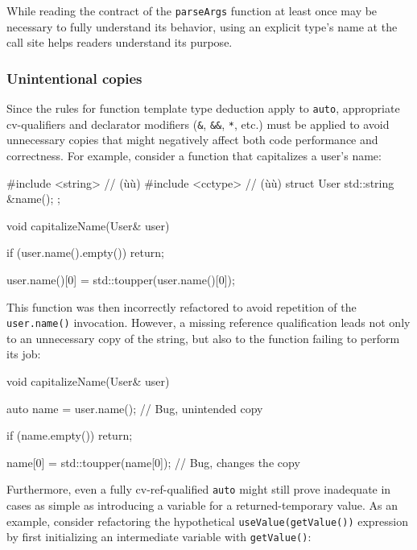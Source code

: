 \noindent While reading the contract of the \lstinline!parseArgs!
function at least once may be necessary to fully understand its behavior, using an
explicit type's name at the call site helps readers understand its
purpose.

\subsubsection[Unintentional copies]{Unintentional copies}\label{unintentional-copies}

Since the rules for function template type deduction apply to
\lstinline!auto!, appropriate cv-qualifiers and declarator modifiers
(\lstinline!&!, \lstinline!&&!, \lstinline!*!, etc.) must be applied to avoid
unnecessary copies that might negatively affect both code performance
and correctness. For example, consider a function that capitalizes a
user's name:

\begin{emcppshiddenlisting}[emcppsbatch={e13,e14}]
#include <string>  // (ù{}ù)
#include <cctype>  // (ù{}ù)
struct User {
   std::string &name();
};
\end{emcppshiddenlisting}
\begin{emcppslisting}[emcppsbatch=e13]
void capitalizeName(User& user)
{
    if (user.name().empty())
    {
        return;
    }

    user.name()[0] = std::toupper(user.name()[0]);
}
\end{emcppslisting}
    
\noindent This function was then incorrectly refactored to avoid repetition of
the \lstinline!user.name()! invocation. However, a missing reference
qualification leads not only to an unnecessary copy of the string, but
also to the function failing to perform its job:

\begin{emcppslisting}[emcppsbatch=e14]
void capitalizeName(User& user)
{
    auto name = user.name();  // Bug, unintended copy

    if (name.empty())
    {
         return;
    }

    name[0] = std::toupper(name[0]);  // Bug, changes the copy
}
\end{emcppslisting}
    
\noindent Furthermore, even a fully cv-ref-qualified \lstinline!auto! might still
prove inadequate in cases as simple as introducing a variable for a
returned-temporary value. As an example, consider refactoring the
hypothetical \lstinline!useValue(getValue())! expression by first
initializing an intermediate variable with \lstinline!getValue()!:

